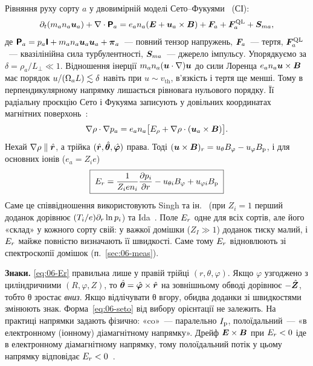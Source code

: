 Рівняння руху сорту $a$ у двовимірній моделі Сето--Фукуями~\cite{Seto2014} (СІ):
\begin{equation}\label{eq:06-mom}
  \partial_t(m_an_a\bm{u}_a)+\nabla\cdot\bm{\mathsf{P}}_a=e_an_a(\bm{E}+\bm{u}_a\times\bm{B})+\bm{F}_a+\bm{F}^{\mathrm{QL}}_a+\bm{S}_{ma},
\end{equation}
де $\bm{\mathsf{P}}_a=p_a\bm{\mathsf{I}}+m_an_a\bm{u}_a\bm{u}_a+\bm{\mathsf{\pi}}_a$~--- повний тензор напружень, $\bm{F}_a$~--- тертя, $\bm{F}^{\mathrm{QL}}_a$~--- квазілінійна сила турбулентності, $\bm{S}_{ma}$~--- джерело імпульсу. Упорядкуємо за $\delta=\rho_a/L_\perp\ll1$. Відношення інерції $m_an_a(\bm{u}\cdot\nabla)\bm{u}$ до сили Лоренца $e_an_a\bm{u}\times\bm{B}$ має порядок $u/(\Omega_{a}L)\lesssim\delta$ навіть при $u\sim v_{\mathrm{th}}$, в'язкість і тертя ще менші. Тому в перпендикулярному напрямку лишається рівновага нульового порядку. Її радіальну проєкцію Сето і Фукуяма записують у довільних координатах магнітних поверхонь~\cite[рівн.~46]{Seto2014}:
\begin{equation}\label{eq:06-seto}
  \nabla\rho\cdot\nabla p_a=e_an_a\bigl[E_\rho+\nabla\rho\cdot(\bm{u}_a\times\bm{B})\bigr].
\end{equation}
Нехай $\nabla\rho\parallel\hat{\bm{r}}$, а трійка $(\hat{\bm{r}},\hat{\bm{\theta}},\hat{\bm{\varphi}})$ права. Тоді $(\bm{u}\times\bm{B})_r=u_\theta B_{\varphi}-u_{\varphi}B_{\mathrm{p}}$, і для основних іонів ($e_a=Z_ie$)
\begin{equation}\label{eq:06-Er}
  \boxed{\;E_{r}=\frac{1}{Z_ien_i}\frac{\partial p_i}{\partial r}-u_{\theta i}B_{\varphi}+u_{\varphi i}B_{\mathrm{p}}\;}
\end{equation}
Саме це співвідношення використовують Singh та ін.~\cite[рівн.~2]{Singh2004} (при $Z_i=1$ перший доданок дорівнює $(T_i/e)\partial_r\ln p_i$) та Ida~\cite{Ida2001}. Поле $E_{r}$ одне для всіх сортів, але його «склад» у кожного сорту свій: у важкої домішки ($Z_I\gg1$) доданок тиску малий, і $E_{r}$ майже повністю визначають її швидкості. Саме тому $E_{r}$ відновлюють зі спектроскопії домішок (п.~\ref{sec:06-meas}).

\textbf{Знаки.} \eqref{eq:06-Er} правильна лише у правій трійці $(r,\theta,\varphi)$. Якщо $\varphi$ узгоджено з циліндричними $(R,\varphi,Z)$, то $\hat{\bm{\theta}}=\hat{\bm{\varphi}}\times\hat{\bm{r}}$ на зовнішньому обводі дорівнює $-\hat{\bm{Z}}$, тобто θ зростає \emph{вниз}. Якщо відлічувати θ вгору, обидва доданки зі швидкостями змінюють знак. Форма~\eqref{eq:06-seto} від вибору орієнтації не залежить. На практиці напрямки задають фізично: «co»~--- паралельно $I_{\mathrm{p}}$, полоїдальний~--- «в електронному (іонному) діамагнітному напрямку». Дрейф $\bm{E}\times\bm{B}$ при $E_{r}<0$ іде в електронному діамагнітному напрямку, тому полоїдальний потік у цьому напрямку відповідає $E_{r}<0$~\cite{Ida2001}.

